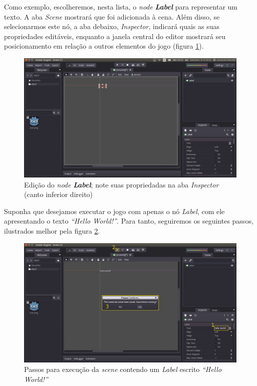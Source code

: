 Como exemplo, escolheremos, nesta lista, o \textit{node} \textbf{\textit{Label}} para representar um texto. A aba \textit{Scene} mostrará que foi adicionada à cena. Além disso, se selecionarmos este nó, a aba debaixo, \textit{Inspector}, indicará quais as suas propriedades editáveis, enquanto a janela central do editor mostrará seu posicionamento em relação a outros elementos do jogo (figura \ref{editor-label}).

\begin{figure}[H]
  \centering
  \includegraphics[width=.9\textwidth]{image/editor-label}
  \caption{Edição do \textit{node} \textbf{\textit{Label}}; note suas propriedadas na aba \textit{Inspector} (canto inferior direito)}
  \label{editor-label}
\end{figure}

Suponha que desejamos executar o jogo com apenas o nó \textit{Label}, com ele apresentando o texto \textit{``Hello World!''}. Para tanto, seguiremos os seguintes passos, ilustrados melhor pela figura \ref{editor-run-scene-edit}.

\begin{figure}[H]
  \centering
  \includegraphics[width=.9\textwidth]{image/editor-run-scene-edit}
  \caption{Passos para execução da \textit{scene} contendo um \textit{Label} escrito \textit{``Hello World!''}}
  \label{editor-run-scene-edit}
\end{figure}

